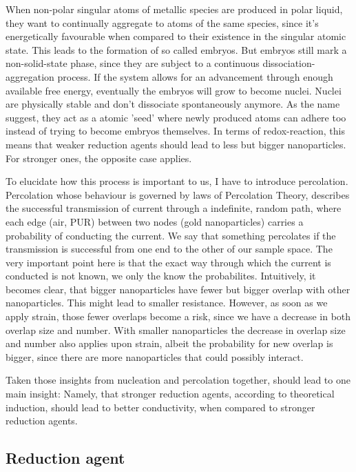 When non-polar singular atoms of metallic species are produced in polar liquid, they want to continually aggregate to atoms of the same species, since it's energetically favourable when compared to their existence in the singular atomic state. This leads to the formation of so called embryos. \cite{Goia} But embryos still mark a non-solid-state phase, since they are subject to a continuous dissociation-aggregation process. If the system allows for an advancement through enough available free energy, eventually the embryos will grow to become nuclei. Nuclei are physically stable and don't dissociate spontaneously anymore. As the name suggest, they act as a atomic 'seed' where newly produced atoms can adhere too instead of trying to become embryos themselves. In terms of redox-reaction, this means that weaker reduction agents should lead to less but bigger nanoparticles. For stronger ones, the opposite case applies. 

To elucidate how this process is important to us, I have to introduce percolation. Percolation whose behaviour is governed by laws of Percolation Theory, describes the successful transmission of current through a indefinite, random path, where each edge (air, PUR) between two nodes (gold nanoparticles) carries a probability of conducting the current. We say that something percolates if the transmission is successful from one end to the other of our sample space. The very important point here is that the exact way through which the current is conducted is not known, we only the know the probabilites. Intuitively, it becomes clear, that bigger nanoparticles have fewer but bigger overlap with other nanoparticles. This might lead to smaller resistance. However, as soon as we apply strain, those fewer overlaps become a risk, since we have a decrease in both overlap size and number. With smaller nanoparticles the decrease in overlap size and number also applies upon strain, albeit the probability for new overlap is bigger, since there are more nanoparticles that could possibly interact.   

Taken those insights from nucleation and percolation together, should lead to one main insight: Namely, that stronger reduction agents, according to theoretical induction, should lead to better conductivity, when compared to stronger reduction agents.

\subsection{Reduction agent}
\label{subsec:RedAgent}


